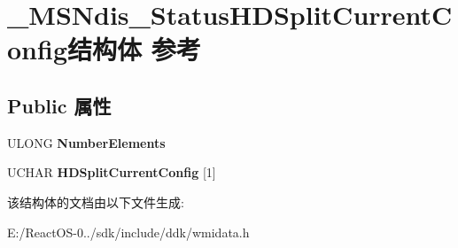 \hypertarget{struct___m_s_ndis___status_h_d_split_current_config}{}\section{\+\_\+\+M\+S\+Ndis\+\_\+\+Status\+H\+D\+Split\+Current\+Config结构体 参考}
\label{struct___m_s_ndis___status_h_d_split_current_config}
\subsection*{Public 属性}
\begin{DoxyCompactItemize}
\item 
\mbox{\label{struct___m_s_ndis___status_h_d_split_current_config_aeaf14e100ad51ea31fd3b60e898cf2e0}} 
U\+L\+O\+NG {\bfseries Number\+Elements}
\item 
\mbox{\label{struct___m_s_ndis___status_h_d_split_current_config_a7ef028c6733a3042ca3a3397da7cdba7}} 
U\+C\+H\+AR {\bfseries H\+D\+Split\+Current\+Config} \mbox{[}1\mbox{]}
\end{DoxyCompactItemize}


该结构体的文档由以下文件生成\+:\begin{DoxyCompactItemize}
\item 
E\+:/\+React\+O\+S-\/0../sdk/include/ddk/wmidata.\+h\end{DoxyCompactItemize}
